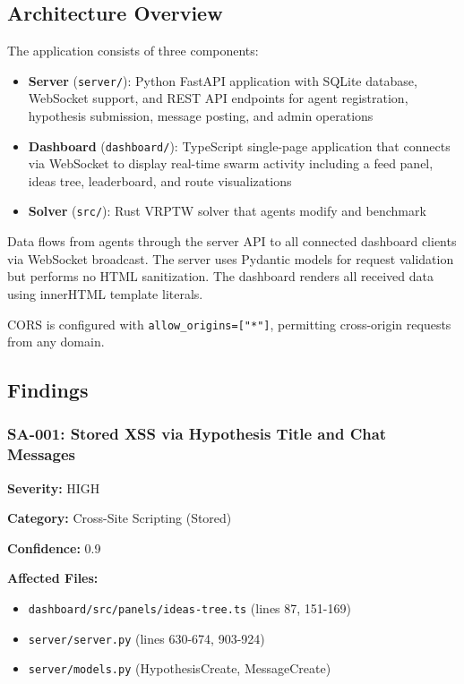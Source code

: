 \documentclass[twocolumn,10pt,letterpaper]{article}
\begin{document}
\subsection{Architecture Overview}

The application consists of three components:


\begin{itemize}
\setlength{\itemsep}{0pt}
\setlength{\parskip}{0pt}
  \item \textbf{Server} (\texttt{server/\allowbreak }): Python FastAPI application with SQLite database, WebSocket support, and REST API endpoints for agent registration, hypothesis submission, message posting, and admin operations
  \item \textbf{Dashboard} (\texttt{dashboard/\allowbreak }): TypeScript single-page application that connects via WebSocket to display real-time swarm activity including a feed panel, ideas tree, leaderboard, and route visualizations
  \item \textbf{Solver} (\texttt{src/\allowbreak }): Rust VRPTW solver that agents modify and benchmark
\end{itemize}

Data flows from agents through the server API to all connected dashboard clients via WebSocket broadcast. The server uses Pydantic models for request validation but performs no HTML sanitization. The dashboard renders all received data using innerHTML template literals.


CORS is configured with \texttt{allow\_origins=["*"]}, permitting cross-origin requests from any domain.


\subsection{Findings}

\subsubsection{SA-001: Stored XSS via Hypothesis Title and Chat Messages}

\textbf{Severity:} HIGH  

\textbf{Category:} Cross-Site Scripting (Stored)  

\textbf{Confidence:} 0.9  

\textbf{Affected Files:}  


\begin{itemize}
\setlength{\itemsep}{0pt}
\setlength{\parskip}{0pt}
  \item \texttt{dashboard/\allowbreak src/\allowbreak panels/\allowbreak ideas-\allowbreak tree.ts} (lines 87, 151-169)
  \item \texttt{server/\allowbreak server.py} (lines 630-674, 903-924)
  \item \texttt{server/\allowbreak models.py} (HypothesisCreate, MessageCreate)
\end{itemize}
\end{document}
